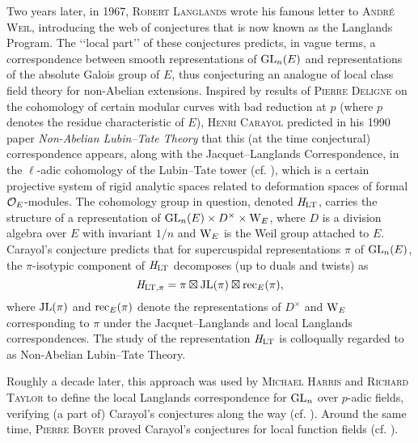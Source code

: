 \documentclass[../main.tex]{subfiles}
\begin{document}
Two years later, in 1967, \textsc{Robert Langlands} wrote his famous letter 
to \textsc{André Weil}, introducing the web of conjectures that 
is now known as the Langlands Program. The ‘‘local part’’ of these conjectures 
predicts, in vague terms, a correspondence between smooth representations
of $\operatorname{GL}_n(E)$ and representations of the absolute Galois group of $E$, thus
conjecturing an analogue of local class field theory for non-Abelian extensions. 
Inspired by results of \textsc{Pierre Deligne} on the cohomology of certain
modular curves with bad reduction at $p$ (where $p$ denotes the residue
characteristic of $E$), \textsc{Henri Carayol} predicted in his 1990 paper
\textit{Non-Abelian Lubin--Tate Theory} that this (at the time conjectural)
correspondence appears, along with the Jacquet--Langlands Correspondence, in
the $\ell$-adic cohomology of the Lubin--Tate tower (cf. \cite{carayol1990non}),
which is a certain projective system of rigid analytic spaces related to
deformation spaces of formal $\mathcal{O}_E$-modules.
The cohomology group in question, denoted $\mathit H_{\mathrm{LT}}$, carries the structure of a
representation of $\operatorname{GL}_n(E) \times D^\times \times \mathrm W_E$, where $D$ is a
division algebra over $E$ with invariant $1/n$ and $\mathrm W_E$ is the Weil group
attached to $E$. Carayol's conjecture predicts that for supercuspidal
representations $\pi$ of $\operatorname{GL}_n(E)$, the $\pi$-isotypic component of $\mathit H_{\mathrm{LT}}$
decomposes (up to duals and twists) as
\begin{equation*}
  \mathit H_{\mathrm{LT},\pi} = \pi \boxtimes \mathrm{JL}(\pi) \boxtimes \mathrm{rec}_E(\pi),
\end{equation*}
where $\mathrm{JL}(\pi)$ and $\mathrm{rec}_E(\pi)$ denote the representations 
of $D^\times$ and $\mathrm W_E$ corresponding to $\pi$ under the Jacquet--Langlands and 
local Langlands correspondences. The study of the representation
$\mathit H_{\mathrm{LT}}$ is colloqually regarded to as Non-Abelian Lubin--Tate Theory.

Roughly a decade later, this approach was used by \textsc{Michael Harris} and
\textsc{Richard Taylor} to define the local Langlands correspondence for
$\operatorname{GL}_n$ over $p$-adic fields, verifying (a part of)
Carayol's conjectures along the way (cf. \cite{HTShimura}). 
Around the same time, \textsc{Pierre Boyer} 
proved Carayol's conjectures for local function fields (cf.
\cite{boyer1999mauvaise}). 
\end{document}

